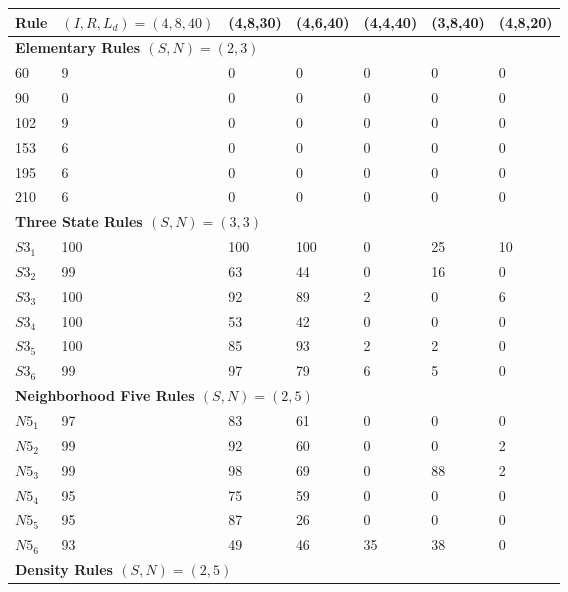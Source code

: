 \documentclass{elsarticle}
\begin{document}
\begin{multicols}{2}
	\begin{table}[!htbp] \centering
		\small
		\begin{tabular}{|l|l|l|l|l|l|l|}
			\hline
			\textbf{Rule} & \textbf{\boldmath$(I,R,L_{d})=(4,8,40)$} & \textbf{(4,8,30)} & 
			\textbf{(4,6,40)} & \textbf{(4,4,40)} & \textbf{(3,8,40)} & \textbf{(4,8,20)} 
			\\ \hline
			\multicolumn{7}{|l|}{\textbf{Elementary Rules \boldmath$(S,N) = (2,3)$}} \\ 
			\hline
			60       & 9   & 0   & 0   & 0  & 0  & 0  \\ \hline
			90       & 0   & 0   & 0   & 0  & 0  & 0  \\ \hline
			102      & 9   & 0   & 0   & 0  & 0  & 0  \\ \hline
			153      & 6   & 0   & 0   & 0  & 0  & 0  \\ \hline
			195      & 6   & 0   & 0   & 0  & 0  & 0  \\ \hline
			210      & 6   & 0   & 0   & 0  & 0  & 0  \\ \hline
			\multicolumn{7}{|l|}{\textbf{Three State Rules \boldmath$(S,N) = (3,3)$}} \\ 
			\hline
			$S3_{1}$ & 100 & 100 & 100 & 0  & 25 & 10 \\ \hline
			$S3_{2}$ & 99  & 63  & 44  & 0  & 16 & 0  \\ \hline
			$S3_{3}$ & 100 & 92  & 89  & 2  & 0  & 6  \\ \hline
			$S3_{4}$ & 100 & 53  & 42  & 0  & 0  & 0  \\ \hline
			$S3_{5}$ & 100 & 85  & 93  & 2  & 2  & 0  \\ \hline
			$S3_{6}$ & 99  & 97  & 79  & 6  & 5  & 0  \\ \hline
			\multicolumn{7}{|l|}{\textbf{Neighborhood Five Rules \boldmath$(S,N) = (2,5)$}} 
			\\ \hline
			$N5_{1}$ & 97  & 83  & 61  & 0  & 0  & 0  \\ \hline
			$N5_{2}$ & 99  & 92  & 60  & 0  & 0  & 2  \\ \hline
			$N5_{3}$ & 99  & 98  & 69  & 0  & 88 & 2  \\ \hline
			$N5_{4}$ & 95  & 75  & 59  & 0  & 0  & 0  \\ \hline
			$N5_{5}$ & 95  & 87  & 26  & 0  & 0  & 0  \\ \hline
			$N5_{6}$ & 93  & 49  & 46  & 35 & 38 & 0  \\ \hline
			\multicolumn{7}{|l|}{\textbf{Density Rules \boldmath$(S,N) = (2,5)$}} \\ \hline

\end{tabular}
\end{table}
\end{multicols}
\end{document}
